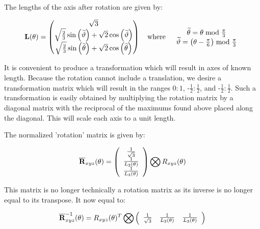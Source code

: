 The lengths of the axis after rotation are given by:

\begin{equation}\label{eq:L}
\mathbf{L}(\theta) =
\begin{pmatrix}
\sqrt{3} \\
 \sqrt{\frac{2}{3}} \sin \left(\widetilde{\vartheta}\right) + \sqrt{2} \cos \left(\widetilde{\vartheta}\right) \\  
\sqrt{\frac{2}{3}} \sin \left(\widetilde{\theta}\right) + \sqrt{2} \cos \left(\widetilde{\theta}\right) 
\end{pmatrix}
\quad \text{where}  \quad 
\begin{array}{c}
\widetilde{\theta} = \theta  \bmod \frac{\pi }{3} \\ 
\widetilde{\vartheta} = \left(\theta - \frac{\pi}{6}\right) \bmod \frac{\pi }{3}
\end{array}
\end{equation}

It is convenient to produce a transformation which will result in axes of known length. Because the rotation cannot include a translation, we desire a transformation matrix which will result in the ranges $0:1$, -$\frac{1}2:\frac{1}2$, and -$\frac{1}2:\frac{1}2$. Such a transformation is easily obtained by multiplying the rotation matrix by a diagonal matrix with the reciprocal of the maximums found above placed along the diagonal. This will scale each axis to a unit length.

The normalized 'rotation' matrix is given by:


\begin{equation}\label{eq:NormRxyz3}
 \overline{\R}_{xyz}(\theta) =
\left(
\begin{array}{c}
 \frac{1}{\sqrt{3}}  \\
 \frac{1}{L_2(\theta)} \\
 \frac{1}{L_3(\theta) }  \\
\end{array}
\right)
\bigotimes
R_{xyz}(\theta)
\end{equation}

This matrix is no longer technically a rotation matrix as its inverse is no longer equal to its transpose. It now equal to:

\begin{equation}\label{eq:NormRxyz3Inverse}
 \overline{\R}_{xyz}^{-1}(\theta) =
 R_{xyz}(\theta)^{T} \bigotimes
\left(
\begin{array}{ccc}
 \frac{1}{\sqrt{3}}  &
 \frac{1}{L_2(\theta)} &
 \frac{1}{L_3(\theta) }
\end{array}
\right)
\end{equation}

